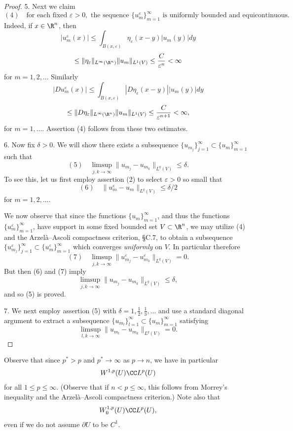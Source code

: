 \begin{proof}
5. Next we claim
$$(4) \quad \text{for each fixed } \varepsilon > 0, \text{ the sequence } \{u_m^\varepsilon\}_{m=1}^\infty \text{ is uniformly bounded and equicontinuous.}$$
Indeed, if $x \in \R^n$, then
$$|u_m^\varepsilon(x)| \le \int_{B(x,\varepsilon)} \eta_\varepsilon(x-y)|u_m(y)| dy$$
$$\le \|\eta_\varepsilon\|_{L^\infty(\R^n)}\|u_m\|_{L^1(V)} \le \frac{C}{\varepsilon^n} < \infty$$
for $m = 1, 2, \ldots$ Similarly
$$|Du_m^\varepsilon(x)| \le \int_{B(x,\varepsilon)} |D\eta_\varepsilon(x-y)||u_m(y)| dy$$
$$\le \|D\eta_\varepsilon\|_{L^\infty(\R^n)}\|u_m\|_{L^1(V)} \le \frac{C}{\varepsilon^{n+1}} < \infty,$$
for $m = 1,\ldots$. Assertion (4) follows from these two estimates.

6. Now fix $\delta > 0$. We will show there exists a subsequence $\{u_{m_j}\}_{j=1}^\infty \subset \{u_m\}_{m=1}^\infty$ such that
$$(5) \quad \limsup_{j,k\to\infty} \|u_{m_j} - u_{m_k}\|_{L^q(V)} \le \delta.$$
To see this, let us first employ assertion (2) to select $\varepsilon > 0$ so small that
$$(6) \quad \|u_m^\varepsilon - u_m\|_{L^q(V)} \le \delta/2$$
for $m = 1, 2, \ldots$.

We now observe that since the functions $\{u_m\}_{m=1}^\infty$, and thus the functions $\{u_m^\varepsilon\}_{m=1}^\infty$, have support in some fixed bounded set $V \subset \R^n$, we may utilize (4) and the Arzelà--Ascoli compactness criterion, §C.7, to obtain a subsequence $\{u_{m_j}^\varepsilon\}_{j=1}^\infty \subset \{u_m^\varepsilon\}_{m=1}^\infty$ which converges \textit{uniformly} on $V$. In particular therefore
$$(7) \quad \limsup_{j,k\to\infty} \|u_{m_j}^\varepsilon - u_{m_k}^\varepsilon\|_{L^q(V)} = 0.$$
But then (6) and (7) imply
$$\limsup_{j,k\to\infty} \|u_{m_j} - u_{m_k}\|_{L^q(V)} \le \delta,$$
and so (5) is proved.

7. We next employ assertion (5) with $\delta = 1, \frac{1}{2}, \frac{1}{3}, \ldots$ and use a standard diagonal argument to extract a subsequence $\{u_{m_l}\}_{l=1}^\infty \subset \{u_m\}_{m=1}^\infty$ satisfying
$$\limsup_{l,k\to\infty} \|u_{m_l} - u_{m_k}\|_{L^q(V)} = 0.$$
\end{proof}

\begin{remark}
\label{rem:compact-embedding-lp-all-p}
Observe that since $p^* > p$ and $p^* \to \infty$ as $p \to n$, we have in particular
$$W^{1,p}(U) \CC L^p(U)$$
for all $1 \le p \le \infty$. (Observe that if $n < p \le \infty$, this follows from Morrey's inequality and the Arzelà--Ascoli compactness criterion.) Note also that
$$W_0^{1,p}(U) \CC L^p(U),$$
even if we do not assume $\partial U$ to be $C^1$.
\end{remark}

